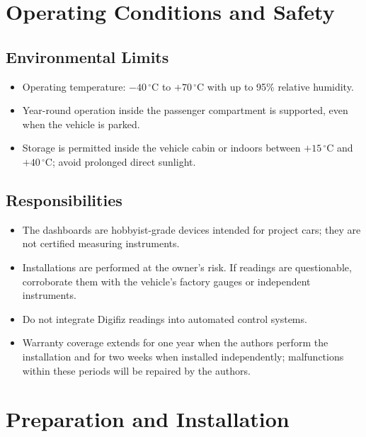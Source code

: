 \section{Operating Conditions and Safety}

\subsection{Environmental Limits}

\begin{itemize}
    \item Operating temperature: \(-40\,^{\circ}\mathrm{C}\) to \(+70\,^{\circ}\mathrm{C}\) with up to 95\% relative humidity.
    \item Year-round operation inside the passenger compartment is supported, even when the vehicle is parked.
    \item Storage is permitted inside the vehicle cabin or indoors between \(+15\,^{\circ}\mathrm{C}\) and \(+40\,^{\circ}\mathrm{C}\); avoid prolonged direct sunlight.
\end{itemize}

\subsection{Responsibilities}

\begin{itemize}
    \item The dashboards are hobbyist-grade devices intended for project cars; they are not certified measuring instruments.
    \item Installations are performed at the owner's risk. If readings are questionable, corroborate them with the vehicle's factory gauges or independent instruments.
    \item Do not integrate Digifiz readings into automated control systems.
    \item Warranty coverage extends for one year when the authors perform the installation and for two weeks when installed independently; malfunctions within these periods will be repaired by the authors.
\end{itemize}

\section{Preparation and Installation}

